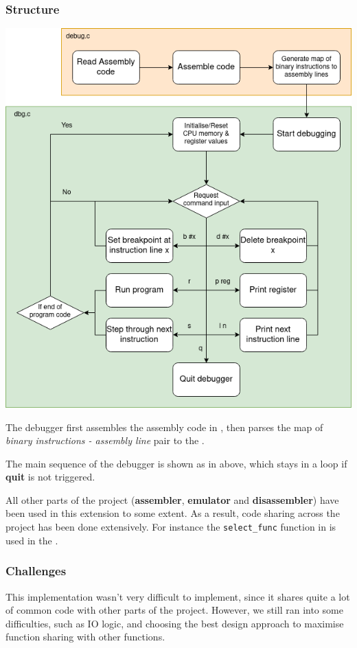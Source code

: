 \documentclass[11pt, a4paper]{article}
\begin{document}
\subsubsection{Structure}
\begin{center}
  \includegraphics[scale=0.4]{report/dbg_arch.png}
\end{center}
The debugger first assembles the assembly code in , then parses the map of \textit{binary instructions - assembly line} pair to the .

The main sequence of the debugger is shown as in  above, which stays in a loop if \textbf{quit} is not triggered.

All other parts of the project (\textbf{assembler}, \textbf{emulator} and \textbf{disassembler}) have been used in this extension to some extent. As a result, code sharing across the project has been done extensively. For instance the \texttt{select\_func} function in  is used in the .

\subsubsection{Challenges}
This implementation wasn't very difficult to implement, since it shares quite a lot of common code with other parts of the project. However, we still ran into some difficulties, such as IO logic, and choosing the best design approach to maximise function sharing with other functions.
\end{document}
